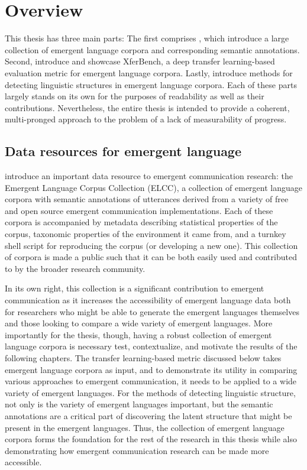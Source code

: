 \section{Overview}

This thesis has three main parts:
The first comprises , which introduce a large collection of emergent language corpora and corresponding semantic annotations.
Second,  introduce and showcase XferBench, a deep transfer learning-based evaluation metric for emergent language corpora.
Lastly,  introduce methods for detecting linguistic structures in emergent language corpora.
Each of these parts largely stands on its own for the purposes of readability as well as their contributions.
Nevertheless, the entire thesis is intended to provide a coherent, multi-pronged approach to the problem of a lack of measurability of progress.


\subsection{Data resources for emergent language}
 introduce an important data resource to emergent communication research: the Emergent Language Corpus Collection (ELCC), a collection of emergent language corpora with semantic annotations of utterances derived from a variety of free and open source emergent communication implementations.
Each of these corpora is accompanied by metadata describing statistical properties of the corpus, taxonomic properties of the environment it came from, and a turnkey shell script for reproducing the corpus (or developing a new one).
This collection of corpora is made a public such that it can be both easily used and contributed to by the broader research community.

In its own right, this collection is a significant contribution to emergent communication as it increases the accessibility of emergent language data both for researchers who might be able to generate the emergent languages themselves and those looking to compare a wide variety of emergent languages.
More importantly for the thesis, though, having a robust collection of emergent language corpora is necessary test, contextualize, and motivate the results of the following chapters.
The transfer learning-based metric discussed below takes emergent language corpora as input, and to demonstrate its utility in comparing various approaches to emergent communication, it needs to be applied to a wide variety of emergent languages.
For the methods of detecting linguistic structure, not only is the variety of emergent languages important, but the semantic annotations are a critical part of discovering the latent structure that might be present in the emergent languages.
Thus, the collection of emergent language corpora forms the foundation for the rest of the research in this thesis while also demonstrating how emergent communication research can be made more accessible.

